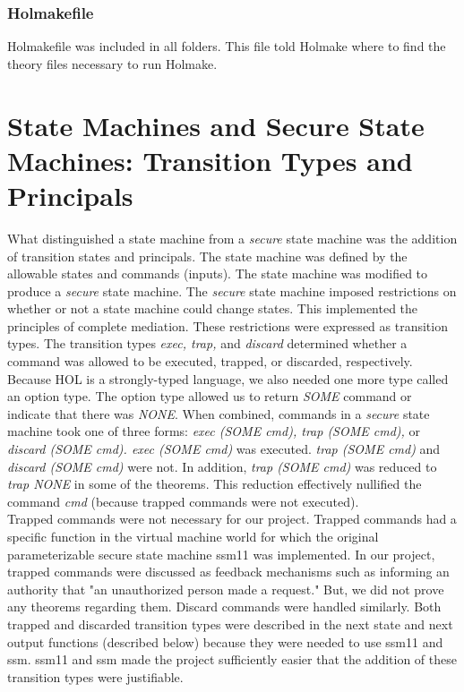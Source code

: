 \subsubsection{Holmakefile}
\label{sec:holmakefile-1}


Holmakefile was included in all folders.  This file told Holmake where to
find the theory files necessary to run Holmake.  


\section{State Machines and Secure State Machines: Transition Types and Principals}
\label{sec:state-mach-secure}



What distinguished a state machine from a \textit{secure} state machine was the
  addition of transition states and principals.  The state machine was defined
  by the allowable states and commands (inputs).  The state machine was modified
  to produce a \textit{secure} state machine.  The \textit{secure} state machine imposed restrictions
  on whether or not a state machine could change states.  This implemented the
  principles of complete mediation.  These restrictions were expressed as transition
  types.  The transition types \textit{exec, trap,} and \textit{discard} determined whether a command
  was allowed to be executed, trapped, or discarded, respectively.  Because HOL
  is a strongly-typed language, we also needed one more type called an option type.
  The option type allowed us to return \textit{SOME} command or indicate that there was \textit{NONE}.
  When combined, commands in a \textit{secure} state machine took one of three forms: \textit{exec
  (SOME cmd), trap (SOME cmd),} or \textit{discard (SOME cmd).  exec (SOME cmd)} was executed.
  \textit{trap (SOME cmd)} and \textit{discard (SOME cmd)} were not.  In addition, \textit{trap (SOME cmd)} was
  reduced to \textit{trap NONE} in some of the theorems.  This reduction effectively nullified
  the command \textit{cmd} (because trapped commands were not executed).\\
  
 Trapped commands were not necessary for our project.  Trapped commands
  had a specific function in the virtual machine world for which the original
  parameterizable secure state machine ssm11 was implemented.  In our project,
  trapped commands were discussed as feedback mechanisms such as informing an
  authority that "an unauthorized person made a request."  But, we did not prove
  any theorems regarding them.  Discard commands were handled similarly.  Both
  trapped and discarded transition types were described in the next state and
  next output functions (described below) because they were needed to use ssm11
  and ssm.  ssm11 and ssm made the project sufficiently easier that the addition
  of these transition types were justifiable.\\
  
